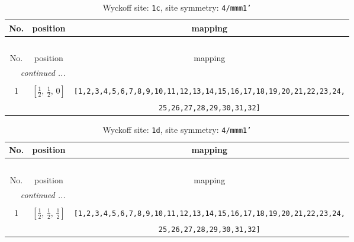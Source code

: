 \documentclass[fleqn,8pt]{jsarticle}
\begin{document}
\renewcommand{\arraystretch}{1.2}
\begin{longtable}{ccc}
\caption{Wyckoff site: {\tt 1c}, site symmetry: {\tt 4/mmm1'}}
 \\
 \hline \hline
No. & position & mapping \\ \hline \endfirsthead

\multicolumn{2}{l}{\tablename\ \thetable{}} \\
 \hline \hline
No. & position & mapping \\ \hline \endhead

 \hline \hline
\multicolumn{2}{r}{\footnotesize\it continued ...} \\ \endfoot

 \hline \hline
\multicolumn{2}{r}{} \\ \endlastfoot

1 & $\left[ \frac{1}{2},\, \frac{1}{2},\, 0 \right]$ & {\tt [1,2,3,4,5,6,7,8,9,10,11,12,13,14,15,16,17,18,19,20,21,22,23,24,} \\ \hline
 &  & {\tt 25,26,27,28,29,30,31,32]} \\
\end{longtable}
\renewcommand{\arraystretch}{1.2}
\begin{longtable}{ccc}
\caption{Wyckoff site: {\tt 1d}, site symmetry: {\tt 4/mmm1'}}
 \\
 \hline \hline
No. & position & mapping \\ \hline \endfirsthead

\multicolumn{2}{l}{\tablename\ \thetable{}} \\
 \hline \hline
No. & position & mapping \\ \hline \endhead

 \hline \hline
\multicolumn{2}{r}{\footnotesize\it continued ...} \\ \endfoot

 \hline \hline
\multicolumn{2}{r}{} \\ \endlastfoot

1 & $\left[ \frac{1}{2},\, \frac{1}{2},\, \frac{1}{2} \right]$ & {\tt [1,2,3,4,5,6,7,8,9,10,11,12,13,14,15,16,17,18,19,20,21,22,23,24,} \\ \hline
 &  & {\tt 25,26,27,28,29,30,31,32]} \\
\end{longtable}
\renewcommand{\arraystretch}{1.2}
\end{document}
